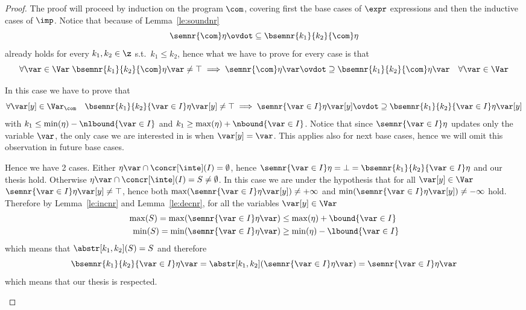 \begin{proof}
  The proof will proceed by induction on the program \(\com\),
  covering first the base cases of \(\expr\) expressions and then the
  inductive cases of \(\imp\). Notice that because of
  Lemma~\ref{le:soundnr}
  \begin{equation*}
    \semnr{\com} \eta \ovdot\subseteq \bsemnr{k_1}{k_2}{\com}\eta
  \end{equation*}
  already holds for every \(k_1, k_2 \in \z\) s.t.\ \(k_1\leq k_2\),
  hence what we have to prove for every case is that
  \begin{equation*}
    \forall \var\in\Var \; \bsemnr{k_1}{k_2}{\com}\eta\var \neq \top \implies \semnr{\com} \eta \var \ovdot\supseteq \bsemnr{k_1}{k_2}{\com}\eta\var \quad \forall \var\in\Var
  \end{equation*}
  \begin{inductive}
     In this case we have to prove that
    \begin{equation*}
      \forall \var[y] \in \Var_{\com} \quad \bsemnr{k_1}{k_2}{\var\in I}\eta\var[y] \neq \top \implies \semnr{\var\in I}\eta \var[y] \ovdot\supseteq \bsemnr{k_1}{k_2}{\var\in I}\eta\var[y]
    \end{equation*}
    with \(k_1\leq \min(\eta) - \nlbound{\var \in I}\) and
    \(k_1\geq \max(\eta) + \nbound{\var \in I}\). Notice that since
    \(\semnr{\var \in I}\eta\) updates only the variable \(\var\), the
    only case we are interested in is when \(\var[y] = \var\). This
    applies also for next base cases, hence we will omit this
    observation in future base cases.

    \medskip

    \noindent
    Hence we have 2 cases. Either
    \(\eta\var \cap \concr[\inte](I) = \emptyset\), hence
    \(\semnr{\var\in I}\eta = \bot = \bsemnr{k_1}{k_2}{\var\in
      I}\eta\) and our thesis hold. Otherwise
    \(\eta\var \cap \concr[\inte](I) = S \neq \emptyset\). In this
    case we are under the hypothesis that for all \(\var[y] \in \Var\)
    \(\semnr{\var\in I}\eta\var[y] \neq \top\), hence both
    \({\max(\semnr{\var\in I}\eta\var[y]) \neq +\infty}\) and
    \({\min(\semnr{\var\in I}\eta\var[y]) \neq -\infty}\) hold.
    Therefore by Lemma~\ref{le:incnr} and Lemma~\ref{le:decnr}, for
    all the variables \(\var[y] \in \Var\)
    \begin{align*}
      \max(S) = \max(\semnr{\var\in I}\eta\var) & \leq \max(\eta) + \bound{\var \in I}\\
      \min(S) = \min(\semnr{\var\in I}\eta\var) & \geq \min(\eta) - \lbound{\var \in I}
    \end{align*}
    which means that \(\abstr[k_1,k_2](S) = S\) and therefore
    \begin{equation*}
      \bsemnr{k_1}{k_2}{\var\in I}\eta\var = \abstr[k_1,k_2](\semnr{\var\in I}\eta\var) = \semnr{\var\in I}\eta\var
    \end{equation*}
    which means that our thesis is respected.


\end{inductive}
\end{proof}

